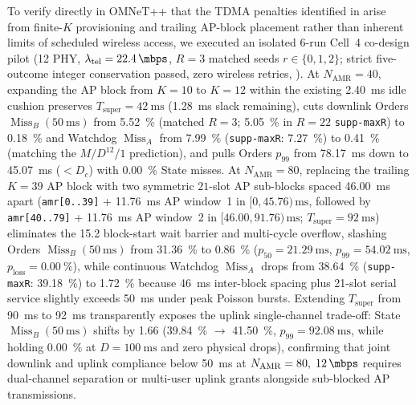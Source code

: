 \documentclass[11pt,a4paper]{article}
\newcommand{\Namr}{\ensuremath{N_{\mathrm{AMR}}}}
\newcommand{\ltel}{\ensuremath{\lambda_{\mathrm{tel}}}}
\newcommand{\Tsuper}{\ensuremath{T_{\mathrm{super}}}}
\newcommand{\MissA}{\ensuremath{\operatorname{Miss}_A}}
\newcommand{\MissB}{\ensuremath{\operatorname{Miss}_B}}
\newcommand{\ploss}{\ensuremath{p_{\mathrm{loss}}}}
\begin{document}
To verify directly in OMNeT++ that the TDMA penalties identified in  arise from finite-$K$ provisioning and trailing AP-block placement rather than inherent limits of scheduled wireless access, we executed an isolated 6-run Cell~4 co-design pilot (\qty{12}{\mbps} PHY, $\ltel = \qty{22.4}{\mbps}$, $R=3$ matched seeds $r \in \{0,1,2\}$; strict five-outcome integer conservation passed, zero wireless retries, ). At $\Namr=40$, expanding the AP block from $K=10$ to $K=12$ within the existing \qty{2.40}{\milli\second} idle cushion preserves $\Tsuper = \qty{42}{\milli\second}$ (\qty{1.28}{\milli\second} slack remaining), cuts downlink Orders $\MissB(\qty{50}{\milli\second})$ from \qty{5.52}{\percent} (matched $R=3$; \qty{5.05}{\percent} in $R=22$ \texttt{supp-maxR}) to \qty{0.18}{\percent} and Watchdog $\MissA$ from \qty{7.99}{\percent} (\texttt{supp-maxR}: \qty{7.27}{\percent}) to \qty{0.41}{\percent} (matching the $M/D^{12}/1$ prediction), and pulls Orders $p_{99}$ from \qty{78.17}{\milli\second} down to \qty{45.07}{\milli\second} ($< D_c$) with \qty{0.00}{\percent} State misses. At $\Namr=80$, replacing the trailing $K=39$ AP block with two symmetric $21$-slot AP sub-blocks spaced \qty{46.00}{\milli\second} apart (\texttt{amr[0..39]} + \qty{11.76}{\milli\second} AP window~1 in $[0, 45.76)\,\text{ms}$, followed by \texttt{amr[40..79]} + \qty{11.76}{\milli\second} AP window~2 in $[46.00, 91.76)\,\text{ms}$; $\Tsuper = \qty{92}{\milli\second}$) eliminates the \qty{15.2}{\pp} block-start wait barrier and multi-cycle overflow, slashing Orders $\MissB(\qty{50}{\milli\second})$ from \qty{31.36}{\percent} to \qty{0.86}{\percent} ($p_{50} = \qty{21.29}{\milli\second}$, $p_{99} = \qty{54.02}{\milli\second}$, $\ploss = \qty{0.00}{\percent}$), while continuous Watchdog $\MissA$ drops from \qty{38.64}{\percent} (\texttt{supp-maxR}: \qty{39.18}{\percent}) to \qty{1.72}{\percent} because \qty{46}{\milli\second} inter-block spacing plus 21-slot serial service slightly exceeds \qty{50}{\milli\second} under peak Poisson bursts. Extending $\Tsuper$ from \qty{90}{\milli\second} to \qty{92}{\milli\second} transparently exposes the uplink single-channel trade-off: State $\MissB(\qty{50}{\milli\second})$ shifts by \qty{+1.66}{\pp} (\qty{39.84}{\percent} $\to$ \qty{41.50}{\percent}, $p_{99} = \qty{92.08}{\milli\second}$, while holding \qty{0.00}{\percent} at $D=\qty{100}{\milli\second}$ and zero physical drops), confirming that joint downlink and uplink compliance below \qty{50}{\milli\second} at $\Namr=80,\; \qty{12}{\mbps}$ requires dual-channel separation or multi-user uplink grants alongside sub-blocked AP transmissions.
\end{document}
